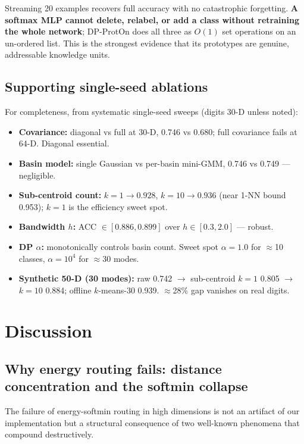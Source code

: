 \documentclass[11pt,a4paper]{article}
\begin{document}
Streaming 20 examples recovers full accuracy with no catastrophic forgetting. \textbf{A softmax MLP cannot delete, relabel, or add a class without retraining the whole network}; DP-ProtOn does all three as $O(1)$ set operations on an un-ordered list. This is the strongest evidence that its prototypes are genuine, addressable knowledge units.

\subsection{Supporting single-seed ablations}

For completeness, from systematic single-seed sweeps (digits 30-D unless noted):

\begin{itemize}[leftmargin=*]
\item \textbf{Covariance:} diagonal vs full at 30-D, 0.746 vs 0.680; full covariance fails at 64-D. Diagonal essential.
\item \textbf{Basin model:} single Gaussian vs per-basin mini-GMM, 0.746 vs 0.749 — negligible.
\item \textbf{Sub-centroid count:} $k{=}1\to0.928$, $k{=}10\to0.936$ (near 1-NN bound 0.953); $k{=}1$ is the efficiency sweet spot.
\item \textbf{Bandwidth $h$:} ACC $\in[0.886,0.899]$ over $h\in[0.3,2.0]$ — robust.
\item \textbf{DP $\alpha$:} monotonically controls basin count. Sweet spot $\alpha{=}1.0$ for $\approx$10 classes, $\alpha{=}10^4$ for $\approx$30 modes.
\item \textbf{Synthetic 50-D (30 modes):} raw 0.742 $\to$ sub-centroid $k{=}1$ 0.805 $\to$ $k{=}10$ 0.884; offline $k$-means-30 0.939. $\approx$28\% gap vanishes on real digits.
\end{itemize}

\section{Discussion}

\subsection{Why energy routing fails: distance concentration and the softmin collapse}

The failure of energy-softmin routing in high dimensions is not an artifact of our implementation but a structural consequence of two well-known phenomena that compound destructively.
\end{document}
